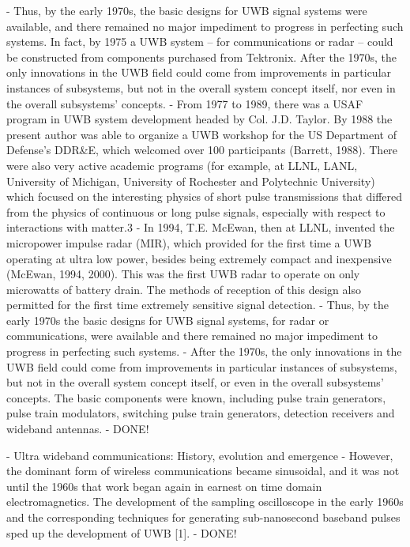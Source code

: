 	- Thus, by the early 1970s, the basic designs for UWB signal systems were available, and there remained no major impediment to progress in perfecting such systems. In fact, by 1975 a UWB system -- for communications or radar -- could be constructed from components purchased from Tektronix. After the 1970s, the only innovations in the UWB field could come from improvements in particular instances of subsystems, but not in the overall system concept itself, nor even in the overall subsystems' concepts.
	- From 1977 to 1989, there was a USAF program in UWB system development headed by Col. J.D. Taylor. By 1988 the present author was able to organize a UWB workshop for the US Department of Defense's DDR\&E, which welcomed over 100 participants (Barrett, 1988). There were also very active academic programs (for example, at LLNL, LANL, University of Michigan, University of Rochester and Polytechnic University) which focused on the interesting physics of short pulse transmissions that differed from the physics of continuous or long pulse signals, especially with respect to interactions with matter.3
	- In 1994, T.E. McEwan, then at LLNL, invented the micropower impulse radar (MIR), which provided for the first time a UWB operating at ultra low power, besides being extremely compact and inexpensive (McEwan, 1994, 2000). This was the first UWB radar to operate on only microwatts of battery drain. The methods of reception of this design also permitted for the first time extremely sensitive signal detection.
	- Thus, by the early 1970s the basic designs for UWB signal systems, for radar or communications, were available and there remained no major impediment to progress in perfecting such systems.
	- After the 1970s, the only innovations in the UWB field could come from improvements in particular instances of subsystems, but not in the overall system concept itself, or even in the overall subsystems' concepts. The basic components were known, including pulse train generators, pulse train modulators, switching pulse train generators, detection receivers and wideband antennas.
	- DONE!
	
\cite{lakkundi2006ultra}
	- Ultra wideband communications: History, evolution and emergence
	- However, the dominant form of wireless communications became sinusoidal, and it was not until the 1960s that work began again in earnest on time domain electromagnetics. The development of the sampling oscilloscope in the early 1960s and the corresponding techniques for generating sub-nanosecond baseband pulses sped up the development of UWB [1].
	- DONE!
	
